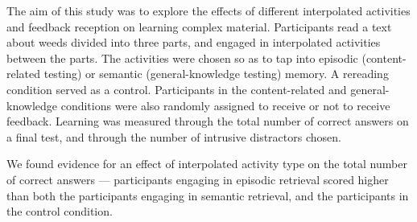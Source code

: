 \documentclass[../main.tex]{subfiles}
\begin{document}
The aim of this study was to explore the effects of different interpolated activities
and feedback reception on learning complex material. Participants read a text
about weeds divided into three parts, and engaged in interpolated activities between
the parts. The activities were chosen so as to tap into episodic (content-related testing)
or semantic (general-knowledge testing) memory. A rereading condition served as a control.
Participants in the content-related and general-knowledge conditions were also randomly
assigned to receive or not to receive feedback. Learning was measured through the total
number of correct answers on a final test, and through the number of intrusive
distractors chosen.

We found evidence for an effect of interpolated activity type on the total number
of correct answers --- participants engaging in episodic retrieval scored higher
than both the participants engaging in semantic retrieval, and the participants
in the control condition.
\end{document}
